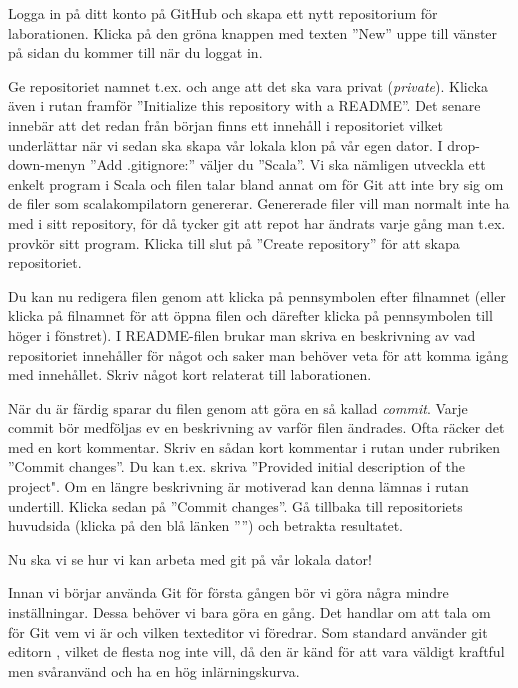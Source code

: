 \begin{Datorarbete}

	\item Logga in på ditt konto på GitHub och skapa ett nytt repositorium för laborationen. Klicka på den gröna knappen med texten ''New'' uppe till vänster på sidan du kommer till när du loggat in.

	Ge repositoriet namnet t.ex. \code{\reponame} och ange att det ska vara privat (\emph{private}). Klicka även i rutan framför ''Initialize this repository with a README''. Det senare innebär att det redan från början finns ett innehåll i repositoriet vilket underlättar när vi sedan ska skapa vår lokala klon på vår egen dator. I drop-down-menyn ''Add .gitignore:'' väljer du ''Scala''. Vi ska nämligen utveckla ett enkelt program i Scala och filen  talar bland annat om för Git att inte bry sig om de filer som scalakompilatorn genererar. Genererade filer vill man normalt inte ha med i sitt repository, för då tycker git att repot har ändrats varje gång man t.ex. provkör sitt program. Klicka till slut på ''Create repository'' för att skapa repositoriet.

	Du kan nu redigera filen  genom att klicka på pennsymbolen efter filnamnet (eller klicka på filnamnet för att öppna filen och därefter klicka på pennsymbolen till höger i fönstret). I README-filen brukar man skriva en beskrivning av vad repositoriet innehåller för något och saker man behöver veta för att komma igång med innehållet. Skriv något kort relaterat till laborationen.

	När du är färdig sparar du filen genom att göra en så kallad \emph{commit}. Varje commit bör medföljas ev en beskrivning av varför filen ändrades. Ofta räcker det med en kort kommentar. Skriv en sådan kort kommentar i rutan under rubriken ''Commit changes''. Du kan t.ex. skriva ''Provided initial description of the project". Om en längre beskrivning är motiverad kan denna lämnas i rutan undertill. Klicka sedan på ''Commit changes''. Gå tillbaka till repositoriets huvudsida (klicka på den blå länken ''\reponame'') och betrakta resultatet.

	Nu ska vi se hur vi kan arbeta med git på vår lokala dator!

	\item Innan vi börjar använda Git för första gången bör vi göra några mindre inställningar. Dessa behöver vi bara göra en gång. Det handlar om att tala om för Git vem vi är och vilken texteditor vi föredrar. Som standard använder git editorn , vilket de flesta nog inte vill, då den är känd för att vara väldigt kraftful men svåranvänd och ha en hög inlärningskurva.
	\\


\end{Datorarbete}

